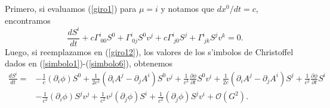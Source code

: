 Primero, si evaluamos (\ref{giro1}) para $\mu=i$ y notamos que $dx^{0}/dt=c$, encontramos
\begin{equation}
\frac{dS^{i}}{dt}+c\Gamma^{i}_{\ 00}S^{0}+\Gamma^{i}_{\ 0j}S^{0}v^j+c\Gamma^{i}_{\ j0}S^{j}+\Gamma^{i}_{\ jk}S^{j}v^k=0.\label{giro12}
\end{equation}
Luego, si reemplazamos en (\ref{giro12}), los valores de los s'imbolos de Christoffel dados en (\ref{simbolo1})-(\ref{simbolo6}), obtenemos
\begin{align}
\frac{dS^{i}}{dt}={}&-\frac{1}{c}(\partial_i\phi)S^0+\frac{1}{2c^2}(\partial_i A^j-\partial_j A^i)S^0v^j+\frac{1}{c^3}\frac{\partial \phi}{\partial t}S^0v^i+\frac{1}{2c}(\partial_i A^j-\partial_j A^i)S^j+\frac{1}{c^2}\frac{\partial \phi}{\partial t}S^i\nonumber\\
{}&-\frac{1}{c^2}(\partial_i \phi) S^jv^j+\frac{1}{c^2}v^j(\partial_j\phi)S^i+\frac{1}{c^2}(\partial_j \phi) S^jv^i+\mathcal{O}(G^2)\label{dsidt}.
\end{align}

